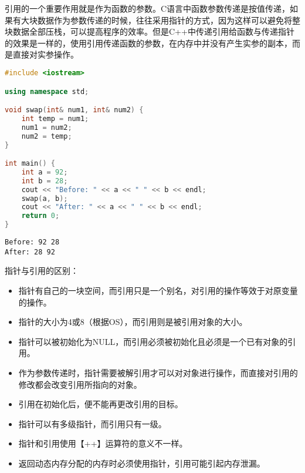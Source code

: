 引用的一个重要作用就是作为函数的参数。C语言中函数参数传递是按值传递，如果有大块数据作为参数传递的时候，往往采用指针的方式，因为这样可以避免将整块数据全部压栈，可以提高程序的效率。但是C++中传递引用给函数与传递指针的效果是一样的，使用引用传递函数的参数，在内存中并没有产生实参的副本，而是直接对实参操作。 \\


\begin{lstlisting}[language=C++]
#include <iostream>

using namespace std;

void swap(int& num1, int& num2) {
    int temp = num1;
    num1 = num2;
    num2 = temp;
}

int main() {
    int a = 92;
    int b = 28;
    cout << "Before: " << a << " " << b << endl;
    swap(a, b);
    cout << "After: " << a << " " << b << endl;
    return 0;
}
\end{lstlisting}

\begin{tcolorbox}
    \begin{verbatim}
Before: 92 28
After: 28 92
	\end{verbatim}
\end{tcolorbox}

指针与引用的区别：

\begin{itemize}
    \item 指针有自己的一块空间，而引用只是一个别名，对引用的操作等效于对原变量的操作。

    \item 指针的大小为4或8（根据OS），而引用则是被引用对象的大小。

    \item 指针可以被初始化为NULL，而引用必须被初始化且必须是一个已有对象的引用。

    \item 作为参数传递时，指针需要被解引用才可以对对象进行操作，而直接对引用的修改都会改变引用所指向的对象。

    \item 引用在初始化后，便不能再更改引用的目标。

    \item 指针可以有多级指针，而引用只有一级。

    \item 指针和引用使用【++】运算符的意义不一样。

    \item 返回动态内存分配的内存时必须使用指针，引用可能引起内存泄漏。
\end{itemize}

